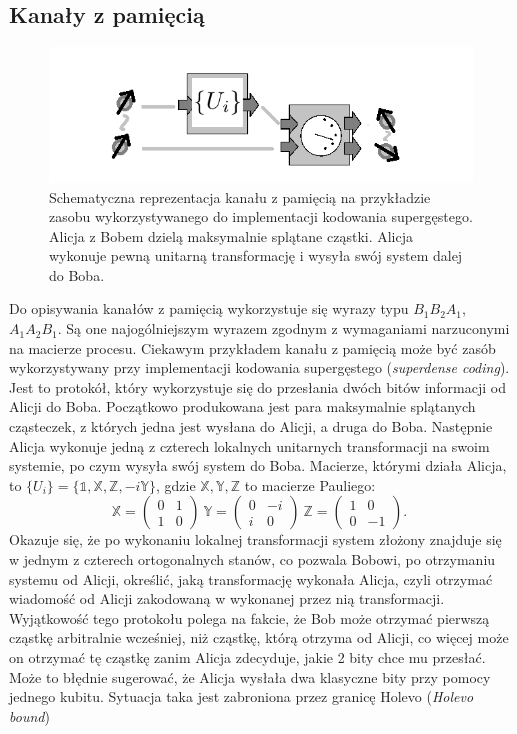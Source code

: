 \documentclass[10pt]{article} %
\newcommand{\X}{\mathbb{X}}
\newcommand{\Y}{\mathbb{Y}}
\newcommand{\Z}{\mathbb{Z}}
\newcommand{\I}{\mathbb{1}}
\begin{document}
\subsection{Kanały z pamięcią}
\begin{figure}[h]
\centering
\includegraphics{obrazki/memory_new}
\caption{Schematyczna reprezentacja kanału z pamięcią na przykładzie zasobu wykorzystywanego do implementacji kodowania supergęstego. Alicja z Bobem dzielą maksymalnie splątane cząstki. Alicja wykonuje pewną unitarną transformację i wysyła swój system dalej do Boba.}
\end{figure}
Do opisywania kanałów z pamięcią wykorzystuje się wyrazy typu $B_1B_2A_1$, $A_1A_2B_1$. Są one najogólniejszym wyrazem zgodnym z wymaganiami narzuconymi na macierze procesu.
Ciekawym przykładem kanału z pamięcią może być zasób wykorzystywany przy implementacji kodowania supergęstego (\textit{superdense coding}). Jest to protokół, który wykorzystuje się do przesłania dwóch bitów informacji od Alicji do Boba. Początkowo produkowana jest para maksymalnie splątanych cząsteczek, z których jedna jest wysłana do Alicji, a druga do Boba. Następnie Alicja wykonuje jedną z czterech lokalnych unitarnych transformacji na swoim systemie, po czym wysyła swój system do Boba. Macierze, którymi działa Alicja, to 
$\{ U_i\}=\{ \I, \X, \Z, -i\Y \}$, gdzie $\X, \Y, \Z$ to macierze Pauliego:
\begin{equation}
\X = \begin{pmatrix}
0 &1\\
1 &0
\end{pmatrix}~
\Y = \begin{pmatrix}
0 &-i\\
i &0
\end{pmatrix}~
\Z = \begin{pmatrix}
1 &0\\
0 &-1
\end{pmatrix}.~
\end{equation} Okazuje się, że po wykonaniu lokalnej transformacji system złożony znajduje się w jednym z czterech ortogonalnych stanów, co pozwala Bobowi, po otrzymaniu systemu od Alicji, określić, jaką transformację wykonała Alicja, czyli otrzymać wiadomość od Alicji zakodowaną w wykonanej przez nią transformacji. Wyjątkowość tego protokołu polega na fakcie, że Bob może otrzymać pierwszą cząstkę arbitralnie wcześniej, niż cząstkę, którą otrzyma od Alicji, co więcej może on otrzymać tę cząstkę zanim Alicja zdecyduje, jakie 2 bity chce mu przesłać. Może to błędnie sugerować, że Alicja wysłała dwa klasyczne bity przy pomocy jednego kubitu. Sytuacja taka jest zabroniona przez granicę Holevo (\textit{Holevo bound})
\end{document}

